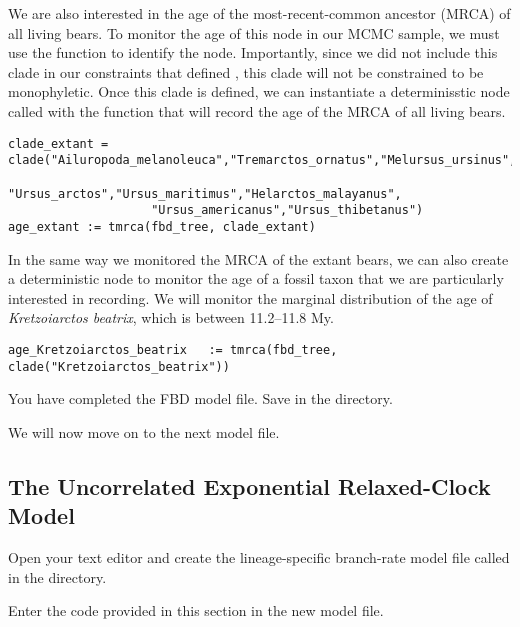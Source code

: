 We are also interested in the age of the most-recent-common ancestor (MRCA) of all living bears. 
To monitor the age of this node in our MCMC sample, we must use the  function to identify the node. Importantly, since we did not include this clade in our constraints that defined , this clade will not be constrained to be monophyletic. 
Once this clade is defined, we can instantiate a determinisstic node called  with the  function that will record the age of the MRCA of all living bears.
{\tt \begin{snugshade*}
\begin{lstlisting}
clade_extant = clade("Ailuropoda_melanoleuca","Tremarctos_ornatus","Melursus_ursinus",
                    "Ursus_arctos","Ursus_maritimus","Helarctos_malayanus",
                    "Ursus_americanus","Ursus_thibetanus")
age_extant := tmrca(fbd_tree, clade_extant)
\end{lstlisting}
\end{snugshade*}}

In the same way we monitored the MRCA of the extant bears, we can also create a deterministic node to monitor the age of a fossil taxon that we are particularly interested in recording. 
We will monitor the marginal distribution of the age of \textit{Kretzoiarctos beatrix}, which is between 11.2--11.8 My.
{\tt \begin{snugshade*}
\begin{lstlisting}
age_Kretzoiarctos_beatrix   := tmrca(fbd_tree, clade("Kretzoiarctos_beatrix"))
\end{lstlisting}
\end{snugshade*}}

{\begin{framed}
You have completed the FBD model file. Save  in the  directory.

We will now move on to the next model file.
\end{framed}}


\bigskip

\subsection{The Uncorrelated Exponential Relaxed-Clock Model}\label{subsect:Exercise-ModelUExp}

{\begin{framed}
Open your text editor and create the lineage-specific branch-rate model file called {\textcolor{red}{}} in the  directory.

Enter the \Rev code provided in this section in the new model file.
\end{framed}}

